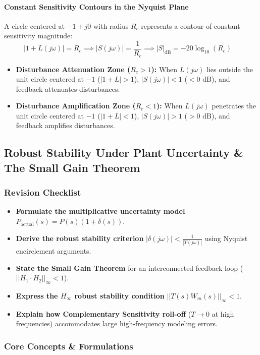 \documentclass[12pt,onecolumn,twoside ]{article}
\begin{document}
	\paragraph{Constant Sensitivity Contours in the Nyquist Plane}
	A circle centered at $-1 + j0$ with radius $R_c$ represents a contour of constant sensitivity magnitude: \[
	|1 + L(j\omega)| = R_c \implies |S(j\omega)| = \frac{1}{R_c} \implies |S|_{\text{dB}} = -20\log_{10}(R_c) \quad
	\]
	\begin{itemize}
		\item
		\textbf{Disturbance Attenuation Zone ($R_c > 1$):} When $L(j\omega)$ lies outside the unit circle centered at $-1$ ($|1 + L| > 1$), $|S(j\omega)| < 1$ ($< 0\text{ dB}$), and feedback attenuates disturbances.
		\item
		\textbf{Disturbance Amplification Zone ($R_c < 1$):} When $L(j\omega)$ penetrates the unit circle centered at $-1$ ($|1 + L| < 1$), $|S(j\omega)| > 1$ ($> 0\text{ dB}$), and feedback amplifies disturbances.
	\end{itemize}
	
	\subsection{Robust Stability Under Plant Uncertainty \& The Small Gain Theorem}
	\subsubsection{Revision Checklist}
	\begin{itemize}
		\item[$\square$]
		\textbf{Formulate the multiplicative uncertainty model} $P_{\text{actual}}(s) = P(s)(1 + \delta(s))$.
		\item[$\square$]
		\textbf{Derive the robust stability criterion} $|\delta(j\omega)| < \frac{1}{|T(j\omega)|}$ using Nyquist encirclement arguments.
		\item[$\square$]
		\textbf{State the Small Gain Theorem} for an interconnected feedback loop ($||H_1 \cdot H_2||_\infty < 1$).
		\item[$\square$]
		\textbf{Express the $H_\infty$ robust stability condition} $||T(s) W_m(s)||_\infty < 1$.
		\item[$\square$]
		\textbf{Explain how Complementary Sensitivity roll-off} ($T \to 0$ at high frequencies) accommodates large high-frequency modeling errors.
	\end{itemize}
	
	\subsubsection{Core Concepts \& Formulations}
\end{document}
